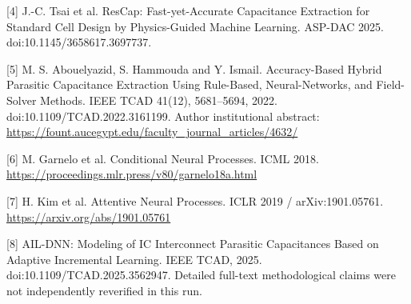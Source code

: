 \documentclass[10pt,twocolumn]{article}
\begin{document}
[4] J.-C. Tsai et al. ResCap: Fast-yet-Accurate Capacitance Extraction for Standard Cell Design by Physics-Guided Machine Learning. ASP-DAC 2025. doi:10.1145/3658617.3697737.

[5] M. S. Abouelyazid, S. Hammouda and Y. Ismail. Accuracy-Based Hybrid Parasitic Capacitance Extraction Using Rule-Based, Neural-Networks, and Field-Solver Methods. IEEE TCAD 41(12), 5681--5694, 2022. doi:10.1109/TCAD.2022.3161199. Author institutional abstract: \url{https://fount.aucegypt.edu/faculty_journal_articles/4632/}

[6] M. Garnelo et al. Conditional Neural Processes. ICML 2018. \url{https://proceedings.mlr.press/v80/garnelo18a.html}

[7] H. Kim et al. Attentive Neural Processes. ICLR 2019 / arXiv:1901.05761. \url{https://arxiv.org/abs/1901.05761}

[8] AIL-DNN: Modeling of IC Interconnect Parasitic Capacitances Based on Adaptive Incremental Learning. IEEE TCAD, 2025. doi:10.1109/TCAD.2025.3562947. Detailed full-text methodological claims were not independently reverified in this run.
\end{document}

